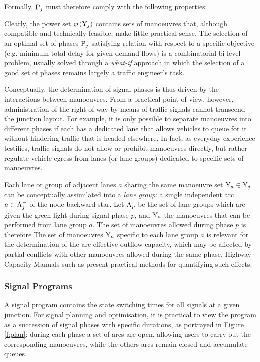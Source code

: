 Formally, $\mathrm{P}_j$ must therefore comply with the following properties:

Clearly, the power set $\wp \left( \mathrm{Y}_j \right)$ contains sets of manoeuvres that, although compatible and technically feasible, make little practical sense.
The selection of an optimal set of phases $\mathrm{P}_j$ satisfying relation  with respect to a specific objective (e.g. minimum total delay for given demand flows) is a combinatorial bi-level problem, usually solved through a \emph{what-if} approach in which the selection of a good set of phases remains largely a traffic engineer's task.

Conceptually, the determination of signal phases is thus driven by the interactions
between manoeuvres. From a practical point of view, however, administration of the right of
way by means of traffic signals cannot transcend the junction layout.
For example, it is only possible to separate manoeuvres into different phases if each has a dedicated lane that allows vehicles to queue for it without hindering traffic that is headed elsewhere. In fact, as everyday experience testifies, traffic signals do not allow or prohibit
manoeuvres directly, but rather regulate vehicle egress from lanes (or lane groups) dedicated
to specific sets of manoeuvres.

Each lane or group of adjacent lanes $a$ sharing the same manoeuvre set $\mathrm{Y}_a \in \mathrm{Y}_j$ can be conceptually assimilated into a \emph{lane group}: a single independent arc $a \in \mathrm{A}_j^-$
of the node backward star.
Let $\mathrm{A}_p$ be the set of lane groups which are given the green light during signal phase $p$,
and $\mathrm{Y}_a$ the manoeuvres that can be performed from lane group $a$.
The set of manoeuvres allowed during phase $p$ is therefore
The set of manoeuvres $\mathrm{Y}_a$ specific to each lane group $a$ is relevant for the determination
of the arc effective outflow capacity, which may be affected by partial conflicts with other
manoeuvres allowed during the same phase. Highway Capacity Manuals such as \hcm present practical
methods for quantifying such effects.

\subsubsection{Signal Programs}
A signal program contains the state switching times for all signals at a given junction.
For signal planning and optimisation, it is practical to view the program as a succession
of signal phases with specific durations, as portrayed in Figure \ref{f:plan}: during each phase a set of arcs are open, allowing users to carry out the corresponding manoeuvres, while the others arcs remain closed and accumulate queues.

